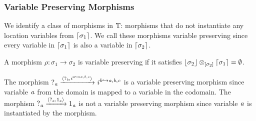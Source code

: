 \subsubsection{Variable Preserving Morphisms}

We identify a class of morphisms in $\mathbb{T}$: morphisms that do not instantiate any location variables from $\lceil\sigma_1\rceil$.
We call these morphisms variable preserving since every variable in $\lceil\sigma_1\rceil$ is also a variable in $\lceil\sigma_2\rceil$.
\begin{definition}
A morphism $\rho : \sigma_1 \to \sigma_2$ is variable preserving if it satisfies $\lfloor\sigma_2\rfloor \otimes_{[\sigma_2]} \lceil\sigma_1\rceil = \emptyset$.
\end{definition}
\begin{example}
    The morphism $?_{\mathit{a}} \xrightarrow{\langle?_{\mathit{b}}, \mathit{i}^{\mathit{a} \hookrightarrow \mathit{a},\mathit{b},\mathit{c}}\rangle} \mathit{i}^{\mathit{b} \hookrightarrow \mathit{a},\mathit{b},\mathit{c}}$ is a variable preserving morphism since variable $\mathit{a}$ from the domain is mapped to a variable in the codomain.
    The morphism $?_{\mathit{a}} \xrightarrow{\langle?_{\mathit{a}}, 1_{\mathit{a}}\rangle} 1_{\mathit{a}}$ is not a variable preserving morphism since variable $\mathit{a}$ is instantiated by the morphism.
\end{example}

